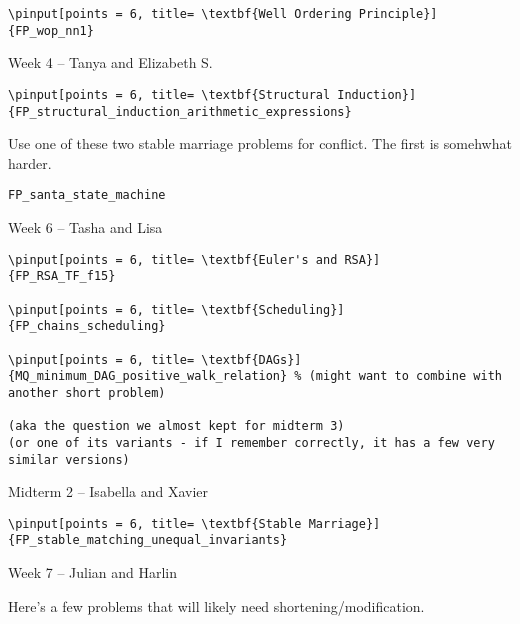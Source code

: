 \documentclass[quiz]{mcs}
\begin{document}
\begin{staffnotes}
\begin{verbatim}
\pinput[points = 6, title= \textbf{Well Ordering Principle}]
{FP_wop_nn1}
\end{verbatim}

\begin{center}
{\large Week 4 -- Tanya and Elizabeth S.}
\end{center}

\begin{verbatim}
\pinput[points = 6, title= \textbf{Structural Induction}]
{FP_structural_induction_arithmetic_expressions}
\end{verbatim}

Use one of these two stable marriage problems for conflict.  The first
is somehwhat harder.

\begin{verbatim}
FP_santa_state_machine
\end{verbatim}

\begin{center}
{\large Week 6 -- Tasha and Lisa}
\end{center}

\begin{verbatim}
\pinput[points = 6, title= \textbf{Euler's and RSA}]
{FP_RSA_TF_f15}

\pinput[points = 6, title= \textbf{Scheduling}]
{FP_chains_scheduling}

\pinput[points = 6, title= \textbf{DAGs}]
{MQ_minimum_DAG_positive_walk_relation} % (might want to combine with another short problem)

(aka the question we almost kept for midterm 3)
(or one of its variants - if I remember correctly, it has a few very similar versions)

\end{verbatim}

\begin{center}
{\large Midterm 2 -- Isabella and Xavier}
\end{center}

\begin{verbatim}
\pinput[points = 6, title= \textbf{Stable Marriage}]
{FP_stable_matching_unequal_invariants}

\end{verbatim}

\begin{center}
{\large Week 7 -- Julian and Harlin}
\end{center}
Here's a few problems that will likely need shortening/modification.


\end{staffnotes}
\end{document}
